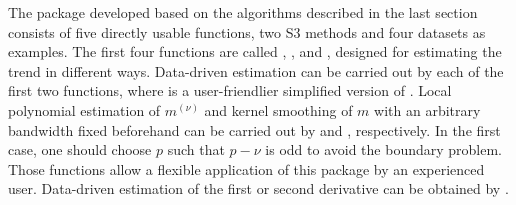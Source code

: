 The package  developed based on the algorithms described in the last section consists of five directly usable functions, two S3 methods and four datasets as examples. The first four functions are called  , ,  and , designed for estimating the trend in different ways. Data-driven estimation can be carried out by each of the first two functions, where  is a user-friendlier simplified version of . 
Local polynomial estimation of $m^{\left(\nu\right)}$ and kernel smoothing of $m$ with an arbitrary bandwidth fixed beforehand can be carried out by  and , respectively. In the first case, one should choose $p$ such that $p-\nu$ is odd to avoid the boundary problem. Those functions allow a flexible application of this package by an experienced user. Data-driven estimation of the first or second derivative can be obtained by . 

